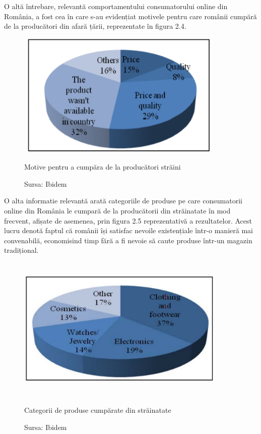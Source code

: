 \documentclass[a4paper, 12pt]{article}
\begin{document}
	\quad O altă întrebare, relevantă comportamentului consumatorului online din România, a fost cea în care s-au evidențiat motivele pentru care românii cumpără de la producători din afară țării, reprezentate în figura 2.4.
	\begin{figure}[!htb]
		\centering
		\includegraphics[width=10cm, height=6cm]{"figures/seventh.png"}
		\caption{Motive pentru a cumpăra de la producători străini}\label{fig:seventh}
		\caption*{Sursa: Ibidem}
	\end{figure}
\newpage
	\quad O alta informatie relevantă arată categoriile de produse pe care consumatorii online din România le cumpară de la producătorii din străinatate în mod frecvent, afișate de asemenea, prin figura 2.5 reprezentativă a rezultatelor. Acest lucru denotă faptul că românii își satisfac nevoile existențiale într-o manieră mai convenabilă, economisind timp fără a fi nevoie să caute produse într-un magazin tradițional.
		\begin{figure}[!htb]
			\centering
			\includegraphics[width=10cm, height=7cm]{"figures/eigth.png"}
			\caption{Categorii de produse cumpărate din străinatate}\label{fig:eigth}
			\caption*{Sursa: Ibidem}
		\end{figure}
	
\newpage		
\end{document}

